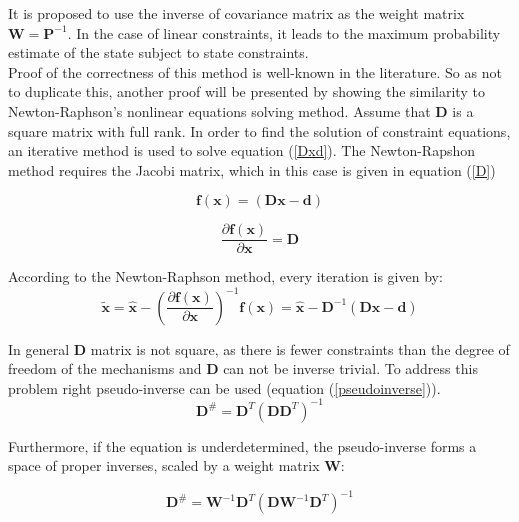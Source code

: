 It is proposed to use the inverse of covariance matrix as the weight matrix  $\bm{W} = \bm{P}^{-1}$. In the case of linear constraints, it leads to the maximum probability
estimate of the state subject to state constraints.\\

Proof of the correctness of this method is well-known in the literature. So as not to duplicate this, another proof will be presented by showing the similarity to Newton-Raphson's nonlinear equations solving method. Assume that $\bm{D}$ is a square matrix with full rank. In order to find the solution of constraint equations, an iterative method is used to solve equation (\ref{Dxd}). The Newton-Rapshon method requires the Jacobi matrix, which in this case is given in equation (\ref{D})

\begin{equation}
	\bm{f} \left( \bm{x} \right) = \left( \bm{D} \bm{x} - \bm{d}  \right)
	\label{Dxd}
\end{equation}

\begin{equation}
	\frac{\partial \bm{f} \left( \bm{x} \right)}{\partial \bm{x}} = \bm{D}
	\label{D}
\end{equation}

According to the Newton-Raphson method, every iteration is given by:
\begin{equation}
	\bm{\tilde{x}} = \bm{\hat{x}} - \left( \frac{\partial \bm{f} \left( \bm{x} \right)}{\partial \bm{x}} \right) ^{-1} \bm{f} \left( \bm{x} \right) = \bm{\hat{x}} - \bm{D}^{-1} \left( \bm{D} \bm{\hat{x}} - \bm{d}  \right)
	\label{NR}
\end{equation}

In general $\bm{D}$ matrix is not square, as there is fewer constraints than the degree of freedom of the mechanisms and $\bm{D}$ can not be inverse trivial. To address this problem right pseudo-inverse can be used (equation (\ref{pseudoinverse})).
\begin{equation}
	\bm{D}^{\#} = \bm{D}^T \left( \bm{D} \bm{D}^T \right) ^ {-1}
	\label{pseudoinverse}
\end{equation}

Furthermore, if the equation is underdetermined, the pseudo-inverse forms a space of proper inverses, scaled by a weight matrix $\bm{W}$:

\begin{equation}
	\bm{D}^{\#} = \bm{W}^{-1} \bm{D}^T \left( \bm{D} \bm{W}^{-1} \bm{D}^T \right) ^ {-1}
	\label{wieight_pseudo}
\end{equation}

